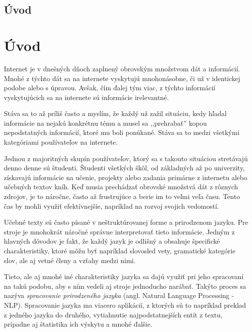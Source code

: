 \newpage
{}
{
	\section{Úvod}
}
{
	\chapter{Úvod}
}
Internet je v dnešných dňoch zaplnený obrovským množstvom dát a informácií. Mnohé z týchto dát sa na internete vyskytujú mnohonásobne, či už v identickej podobe alebo s úpravou. Avšak, čím ďalej tým viac, z týchto informácií vyskytujúcich sa na internete sú informácie irelevantné.

Stáva sa to až príliš často a myslím, že každý už zažil situáciu, kedy hľadal informácie na nejakú konkrétnu tému a musel sa ,,prehrabať'' kopou nepodstatných informácií, ktoré mu boli ponúkané. Stáva sa to medzi všetkými kategóriami používateľov na internete.

Jednou z majoritných skupín používateľov, ktorý sa s takouto situáciou stretávajú denno denne sú študenti. Študenti všetkých škôl, od základných až po univerzity, získavajú informácie na učenie, projekty alebo zadania primárne z internetu alebo učebných textov kníh. Keď musia prechádzať obrovské množstvá dát z rôznych zdrojov, je to náročne, často až frustrujúce a berie im to veľmi veľa času. Tento čas by mohli využiť efektívnejšie, napríklad na rozvoj svojich vedomostí.

Učebné texty sú často písané v neštruktúrovanej forme a prirodzenom jazyku. Pre stroje je mnohokrát náročné správne interpretovať tieto informácie. Jedným z hlavných dôvodov je fakt, že každý jazyk je odlišný a obsahuje špecifické charakteristiky, ktoré môžu byť napríklad slovosled vety, gramatické kategórie slov, ale aj vetné členy a vzťahy medzi nimi.

Tieto, ale aj mnohé iné charakteristiky jazyka sa dajú využiť pri jeho spracovaní na takú podobu, aby s ním vedeli aj stroje jednoducho narábať. Takýto proces sa nazýva \textit{spracovanie prirodzeného jazyka} (angl. Natural Language Processing - NLP). Spracovanie jazyka ma viacero aplikácií, z ktorých sú to napríklad preklad z jedného jazyka do druhého, vytiahnutie najpodstatnejších entít z textu, prípadne aj štatistika ich výskytu a mnohé ďalšie.

